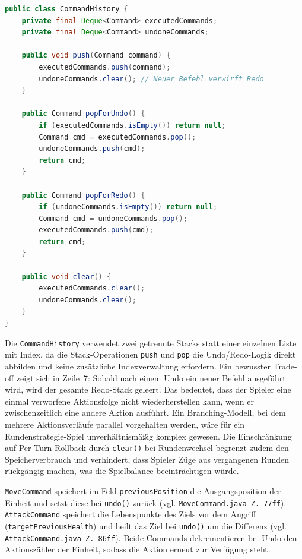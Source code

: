 \begin{lstlisting}[language=Java, caption={CommandHistory -- Undo/Redo mit zwei Stacks}, label={lst:command-history}]
public class CommandHistory {
    private final Deque<Command> executedCommands;
    private final Deque<Command> undoneCommands;

    public void push(Command command) {
        executedCommands.push(command);
        undoneCommands.clear(); // Neuer Befehl verwirft Redo
    }

    public Command popForUndo() {
        if (executedCommands.isEmpty()) return null;
        Command cmd = executedCommands.pop();
        undoneCommands.push(cmd);
        return cmd;
    }

    public Command popForRedo() {
        if (undoneCommands.isEmpty()) return null;
        Command cmd = undoneCommands.pop();
        executedCommands.push(cmd);
        return cmd;
    }

    public void clear() {
        executedCommands.clear();
        undoneCommands.clear();
    }
}
\end{lstlisting}

Die \texttt{CommandHistory} verwendet zwei getrennte Stacks statt einer einzelnen Liste mit Index, da die Stack-Operationen
\texttt{push} und \texttt{pop} die Undo/Redo-Logik direkt abbilden und keine zusätzliche Indexverwaltung erfordern. Ein bewusster
Trade-off zeigt sich in Zeile~7: Sobald nach einem Undo ein neuer Befehl ausgeführt wird, wird der gesamte Redo-Stack geleert.
Das bedeutet, dass der Spieler eine einmal verworfene Aktionsfolge nicht wiederherstellen kann, wenn er zwischenzeitlich eine
andere Aktion ausführt. Ein Branching-Modell, bei dem mehrere Aktionsverläufe parallel vorgehalten werden, wäre für ein
Rundenstrategie-Spiel unverhältnismäßig komplex gewesen. Die Einschränkung auf Per-Turn-Rollback durch \texttt{clear()} bei
Rundenwechsel begrenzt zudem den Speicherverbrauch und verhindert, dass Spieler Züge aus vergangenen Runden rückgängig machen,
was die Spielbalance beeinträchtigen würde.

\texttt{MoveCommand} speichert im Feld \texttt{previousPosition} die Ausgangsposition der Einheit und setzt diese bei \texttt{undo()} zurück (vgl. \texttt{MoveCommand.java Z.\,77ff}).
\texttt{AttackCommand} speichert die Lebenspunkte des Ziels vor dem Angriff (\texttt{targetPreviousHealth}) und heilt das Ziel bei \texttt{undo()} um die Differenz (vgl. \texttt{AttackCommand.java Z.\,86ff}).
Beide Commands dekrementieren bei Undo den Aktionszähler der Einheit, sodass die Aktion erneut zur Verfügung steht.

